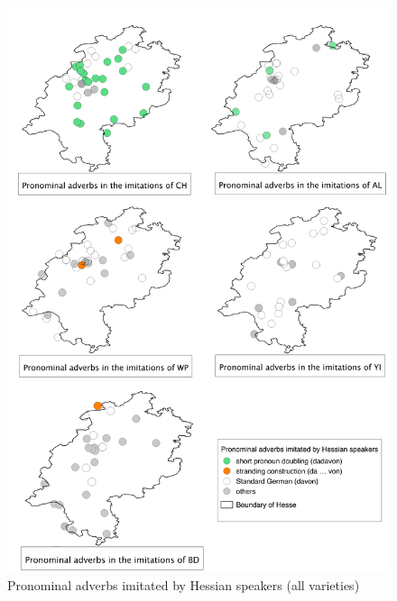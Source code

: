 \documentclass[output=paper]{LSP/langsci}
\begin{document}
\begin{figure}[p]
\centering
\includegraphics[scale=0.49]{illustrations/schaf_etal_fig4}
		\caption{\label{diagramdadavonhessen} Pronominal adverbs imitated by Hessian speakers (all varieties)}
\end{figure}
% 
\end{document}
